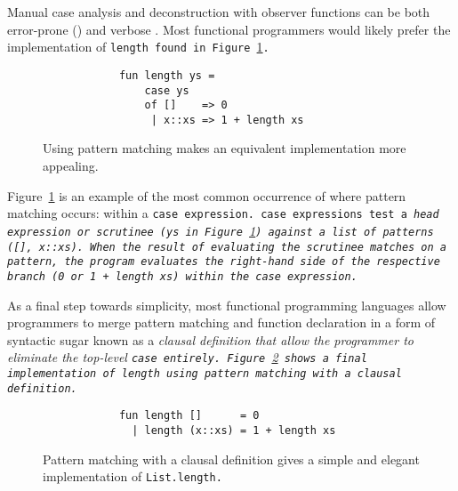 \documentclass[manuscript,screen,review, 12pt]{acmart}
\begin{document}
\begin{outline}[enumerate]
    Manual case analysis and deconstruction with observer functions can be both
    error-prone () and verbose . Most functional programmers would likely prefer the
    implementation of \tt{length} found in Figure~\ref{fig:pmlen}.
    \begin{figure}[htt]
    \begin{verbatim}
            fun length ys =
                case ys 
                of []    => 0
                 | x::xs => 1 + length xs
        \end{verbatim}

    \caption{Using pattern matching makes an equivalent implementation 
             more appealing.}

    \label{fig:pmlen}
    \end{figure}

    Figure~\ref{fig:pmlen} is an example of the most common occurrence of where
    pattern matching occurs: within a \tt{case} expression. \tt{case}
    expressions test a \it{head expression} or \it{scrutinee} (\tt{ys} in
    Figure~\ref{fig:pmlen}) against a list of patterns (\tt{[]}, \tt{x::xs}).
    When the result of evaluating the scrutinee matches on a pattern, the
    program evaluates the right-hand side of the respective branch (\tt{0} or
    \tt{1 + length xs}) within the \it{case} expression. 

    As a final step towards simplicity, most functional programming languages
    allow programmers to merge pattern matching and function declaration in a
    form of syntactic sugar known as a \it{clausal definition} that allow the
    programmer to eliminate the top-level \tt{case} entirely.
    Figure~\ref{fig:pmclausallen} shows a final implementation of \tt{length}
    using pattern matching with a clausal definition. 

    \begin{figure}[ht]
    \smllst
    \begin{verbatim}
            fun length []      = 0
              | length (x::xs) = 1 + length xs
        \end{verbatim}
    \caption{Pattern matching with a clausal definition gives a simple and 
             elegant implementation of \tt{List.length}.}
    \label{fig:pmclausallen}
    \end{figure}
        


\end{outline}
\end{document}
